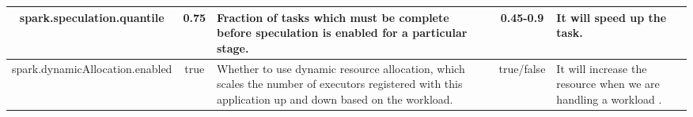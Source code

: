 \begin{table*}[!htbp]
\begin{center}
\begin{tabular}{ | c | c  | p{4cm} | c | p{5cm} |}
  \hline
    spark.speculation.quantile &  0.75 & Fraction of tasks which must be complete before speculation is enabled for a particular stage. & 0.45-0.9 & It will speed up the task.\\
  \hline
     spark.dynamicAllocation.enabled &  true & Whether to use dynamic resource allocation, which scales the number of executors registered with this application up and down based on the workload. & true/false & It will increase the resource when we are handling a workload .\\
   \hline    
    \end{tabular}
\end{center}	
\end{table*}




